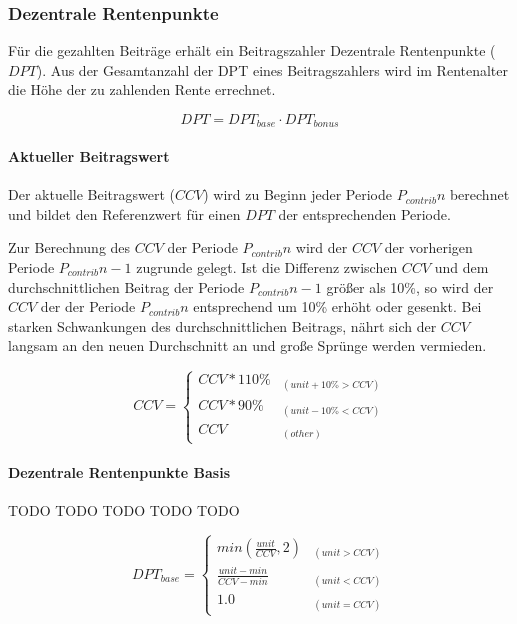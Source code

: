 \subsubsection*{Dezentrale Rentenpunkte}
Für die gezahlten Beiträge erhält ein Beitragszahler Dezentrale Rentenpunkte
($DPT$). Aus der Gesamtanzahl der DPT eines Beitragszahlers wird im Rentenalter
die Höhe der zu zahlenden Rente errechnet.

\begin{equation}
DPT = DPT_{base} \cdot DPT_{bonus}
\end{equation}

\paragraph*{Aktueller Beitragswert}
Der aktuelle Beitragswert ($CCV$) wird zu Beginn jeder Periode 
$P_{contrib}{n}$ berechnet und bildet den Referenzwert für einen $DPT$ der
entsprechenden Periode.

Zur Berechnung des $CCV$ der Periode $P_{contrib}{n}$ wird der $CCV$ der vorherigen
Periode $P_{contrib}{n-1}$ zugrunde gelegt. Ist die Differenz zwischen $CCV$ und dem
durchschnittlichen Beitrag der Periode $P_{contrib}{n-1}$ größer als 10\%, so wird
der $CCV$ der der Periode $P_{contrib}{n}$ entsprechend um 10\% erhöht oder gesenkt.
Bei starken Schwankungen des durchschnittlichen Beitrags, nährt sich der $CCV$ langsam an den neuen Durchschnitt an und große Sprünge werden vermieden.

\begin{equation}
CCV = \begin{cases} 
CCV * 110\% & _{(unit+10\% > CCV)} \\
CCV * 90\% & _{(unit-10\% < CCV)} \\
CCV & _{(other)}
\end{cases}
\end{equation}

\paragraph*{Dezentrale Rentenpunkte Basis}
TODO TODO TODO TODO TODO

\begin{equation}
DPT_{base} = \begin{cases} 
min(\frac{unit} {CCV}, 2) 
  & _{(unit > CCV)} \\
\frac{unit - min} {CCV - min} 
  & _{(unit < CCV)} \\
1.0 & _{(unit = CCV)}
\end{cases}
\end{equation}


